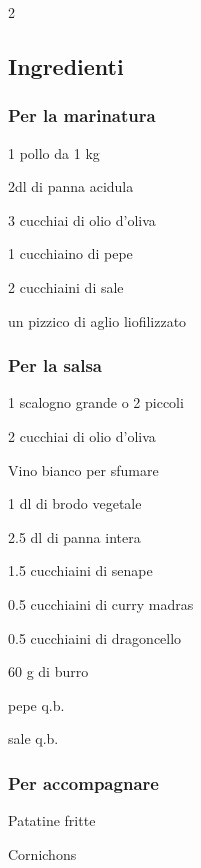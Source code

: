 \newpage
{}

\begin{multicols}{2}
	\subsection*{Ingredienti}
	
	\subsubsection*{Per la marinatura}
	\begin{ingredients}
		\item 1 pollo da 1 kg
		\item 2dl di panna acidula
		\item 3 cucchiai di olio d'oliva
		\item 1 cucchiaino di pepe
		\item 2 cucchiaini di sale
		\item un pizzico di aglio liofilizzato
	\end{ingredients}
	
		\subsubsection*{Per la salsa}
	\begin{ingredients}
		\item 1 scalogno grande o 2 piccoli
		\item 2 cucchiai di olio d'oliva
		\item Vino bianco per sfumare
		\item 1 dl di brodo vegetale
		\item 2.5 dl di panna intera
		\item 1.5 cucchiaini di senape
		\item 0.5 cucchiaini di curry madras
		\item 0.5 cucchiaini di dragoncello
		\item 60 g di burro
		\item pepe q.b.
		\item sale q.b.
	\end{ingredients}
	
	\subsubsection*{Per accompagnare}
	\begin{ingredients}
		\item Patatine fritte
		\item Cornichons
	\end{ingredients}

	\end{multicols}

